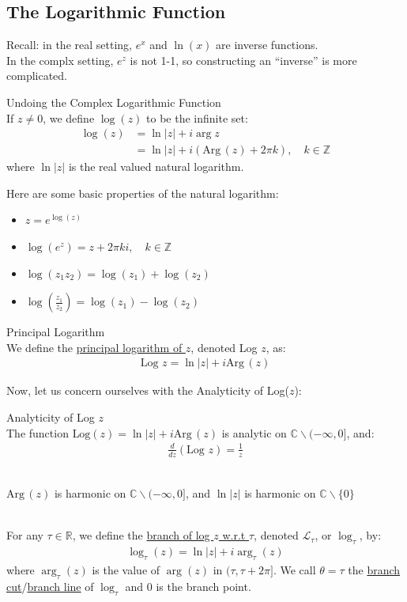 \documentclass[10pt]{paper}
\newcommand{\Z}{\mathbb{Z}}\newcommand{\R}{\mathbb{R}}\newcommand{\N}{\mathbb{N}}\newcommand{\Q}{\mathbb{Q}}\newcommand{\C}{\mathbb{C}}
\newcommand{\gspc}{\vspace{0.13cm}} %
\newcommand{\gline}[0]{\gspc\\} %
\newcommand{\cpr}[1]{\left(#1\right)}
\newcommand{\Arg}{\mathrm{Arg}\,}
\newcommand{\ul}[1]{\underline{#1}}
\begin{document}
\subsection{The Logarithmic Function}

Recall: in the real setting, $e^x$ and $\ln(x)$ are inverse functions.\gline{}
In the complx setting, $e^z$ is not 1-1, so constructing an ``inverse'' is more complicated. 
\begin{definition}{Undoing the Complex Logarithmic Function}{}\gline{}
  If $z\ne 0$, we define $\log(z)$ to be the infinite set:
  \begin{align*}
    \log(z) &= \ln|z|+i\arg{z}\\
    &= \ln|z|+i(\Arg(z) + 2\pi k), \quad k\in \Z
  \end{align*}
  where $\ln|z|$ is the real valued natural logarithm.
\end{definition}
Here are some basic properties of the natural logarithm:
\begin{itemize}[parsep=0pt, itemsep=0pt]
  \item $z = e^{\log(z)}$
  \item $\log(e^z)=z+2\pi ki,\quad k\in \Z$
  \item $\log(z_1z_2) = \log(z_1) + \log(z_2)$
  \item $\log\cpr{\frac{z_1}{z_2}}=\log(z_1)-\log(z_2)$
\end{itemize}
\begin{definition}{Principal Logarithm}{}\gline
    We define the \underline{principal logarithm of $z$}, denoted Log $z$, as:
    \begin{align*}
      \text{Log } z = \ln|z|+i\Arg(z)
    \end{align*}
  \end{definition}
Now, let us concern ourselves with the Analyticity of Log($z$):
\begin{theorem}{}{Analyticity of Log $z$}\gline{}
  The function $\text{Log}(z) = \ln|z| + i\Arg (z)$ is analytic on $\C \backslash (-\infty, 0]$, and:
  \begin{align*}
    \frac{d}{dz}\cpr{\text{Log }z}=\frac{1}z
  \end{align*}
  \begin{corollary}{}{}\gline{}
    $\Arg(z)$ is harmonic on $\C\backslash(-\infty, 0]$, and $\ln|z|$ is harmonic on $\C\backslash\{0\}$
  \end{corollary}
\end{theorem}
\begin{definition}{}{}\gline{}
  For any $\tau \in \R$, we define the \ul{branch of log $z$ w.r.t $\tau$}, denoted $\mathscr{L}_\tau$, or $\log_\tau$, by:
  \begin{align*}
    \log_\tau(z) = \ln|z| + i \arg_\tau(z)
  \end{align*}
  where $\arg_\tau(z)$ is the value of $\arg(z)$ in $(\tau, \tau + 2\pi]$. We call $\theta = \tau$ the \ul{branch cut}/\ul{branch line} of $\log_\tau$ and $0$ is the branch point. 
\end{definition}
\end{document}

